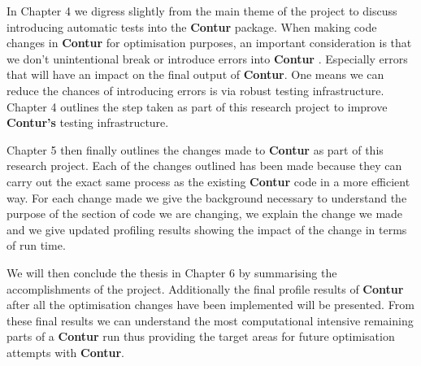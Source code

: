 In Chapter 4 we digress slightly from the main theme of the project to discuss introducing automatic tests into the \textbf{Contur} package. When making code changes in \textbf{Contur} for optimisation purposes, an important consideration is that we don't unintentional break or introduce errors into \textbf{Contur} . Especially errors that will have an impact on the final output of \textbf{Contur}. One means we can reduce the chances of introducing errors is via robust testing infrastructure. Chapter 4 outlines the step taken as part of this research project to improve \textbf{Contur's} testing infrastructure.

Chapter 5 then finally outlines the changes made to \textbf{Contur}  as part of this research project. Each of the changes outlined has been made because they can carry out the exact same process as the existing \textbf{Contur}  code in a more efficient way. For each change made we give the background necessary to understand the purpose of the section of code we are changing, we explain the change we made and we give updated profiling results showing the impact of the change in terms of run time.

We will then conclude the thesis in Chapter 6 by summarising the accomplishments of the project. Additionally the final profile results of \textbf{Contur}  after all the optimisation changes have been implemented will be presented. From these final results we can understand the most computational intensive remaining parts of a \textbf{Contur}  run thus providing the target areas for future optimisation attempts with \textbf{Contur}.  

